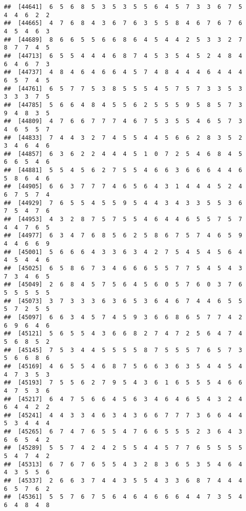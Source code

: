 \documentclass[
]{book}
\begin{document}
\begin{verbatim}
##  [44641]  6  5  6  8  5  3  5  3  5  5  6  4  5  7  3  3  6  7  5  4  4  6  2  2
##  [44665]  4  7  6  8  4  3  6  7  6  3  5  5  8  4  6  7  6  7  6  4  5  4  6  3
##  [44689]  8  6  6  5  5  6  6  8  6  4  5  4  4  2  5  3  3  2  7  8  7  7  4  5
##  [44713]  6  5  5  4  4  4  6  8  7  4  5  3  5  4  5  2  4  8  4  6  4  6  7  3
##  [44737]  4  8  4  6  4  6  6  4  5  7  4  8  4  4  4  6  4  4  4  6  5  7  4  5
##  [44761]  6  5  7  7  5  3  8  5  5  5  4  5  7  5  7  3  3  5  3  3  3  3  7  5
##  [44785]  5  6  6  4  8  4  5  5  6  2  5  5  5  9  5  8  5  7  3  9  4  8  3  5
##  [44809]  4  7  6  6  7  7  7  4  6  7  5  3  5  5  4  6  5  7  3  4  6  5  5  7
##  [44833]  7  4  4  3  2  7  4  5  5  4  4  5  6  6  2  8  3  5  2  3  4  6  4  6
##  [44857]  6  3  6  2  2  4  4  4  5  1  0  7  2  5  4  6  8  4  5  6  6  5  4  6
##  [44881]  5  5  4  5  6  2  7  5  5  4  6  6  3  6  6  6  4  4  6  5  8  6  4  6
##  [44905]  6  6  3  7  7  7  4  6  5  6  4  3  1  4  4  4  5  2  4  6  7  5  7  4
##  [44929]  7  6  5  5  4  5  5  9  5  4  4  3  4  3  3  5  5  3  6  7  5  4  7  6
##  [44953]  4  3  2  8  7  5  7  5  5  4  6  4  4  6  5  5  7  5  7  4  4  7  6  5
##  [44977]  6  3  4  7  6  8  5  6  2  5  8  6  7  5  7  4  6  5  9  4  4  6  6  9
##  [45001]  5  6  6  6  4  3  3  6  3  4  2  7  5  4  5  4  5  6  4  4  5  4  4  6
##  [45025]  6  5  8  6  7  3  4  6  6  6  5  5  7  7  5  4  5  4  3  7  3  4  6  5
##  [45049]  2  6  8  4  5  7  5  6  4  5  6  0  5  7  6  0  3  7  6  5  5  5  5  5
##  [45073]  3  7  3  3  3  6  3  6  5  3  6  4  6  7  4  4  6  5  5  5  7  2  5  5
##  [45097]  6  6  3  4  5  7  4  5  9  3  6  6  8  6  5  7  7  4  2  6  9  6  4  6
##  [45121]  5  6  5  5  4  3  6  6  8  2  7  4  7  2  5  6  4  7  4  5  6  8  5  2
##  [45145]  7  5  3  4  4  5  5  5  5  8  7  5  5  5  7  6  5  7  3  5  6  6  8  6
##  [45169]  4  6  5  5  4  6  8  7  5  6  6  3  6  3  5  4  4  5  4  4  7  3  5  3
##  [45193]  7  5  5  6  2  7  9  5  4  3  6  1  6  5  5  5  4  6  6  4  7  5  3  6
##  [45217]  6  4  7  5  6  6  4  5  6  3  4  6  4  6  5  4  3  2  4  6  4  4  2  2
##  [45241]  4  4  3  3  4  6  3  4  3  6  6  7  7  7  3  6  6  4  4  5  3  4  4  4
##  [45265]  6  7  4  7  6  5  5  4  7  6  6  5  5  5  2  3  6  4  3  6  6  5  4  2
##  [45289]  5  5  7  4  2  4  2  5  5  4  4  5  7  7  6  5  5  5  5  5  4  7  4  2
##  [45313]  6  7  6  7  6  5  5  4  3  2  8  3  6  5  3  5  4  6  4  4  3  5  5  6
##  [45337]  2  6  6  3  7  4  4  3  5  5  4  3  3  6  8  7  4  4  4  6  5  7  6  2
##  [45361]  5  5  7  6  7  5  6  4  6  4  6  6  6  4  4  7  3  5  4  6  4  8  4  8

\end{verbatim}
\end{document}
